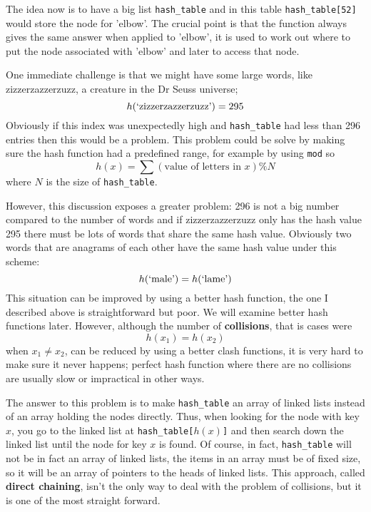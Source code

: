 \documentclass[11pt,a4paper]{scrartcl}
\begin{document}
The idea now is to have a big list \texttt{hash\_table} and in this
table \texttt{hash\_table[52]} would store the node for 'elbow'. The
crucial point is that the function always gives the same answer when
applied to 'elbow', it is used to work out where to put the node
associated with 'elbow' and later to access that node.

One immediate challenge is that we might have some large words, like
zizzerzazzerzuzz, a creature in the Dr Seuss universe;
\begin{equation}
h(\mbox{\lq{}zizzerzazzerzuzz\rq{}})=295
\end{equation}
Obviously if this index was unexpectedly high and \texttt{hash\_table}
had less than 296 entries then this would be a problem. This problem
could be solve by making sure the hash function had a predefined
range, for example by using \texttt{mod} so
\begin{equation}
h(x)=\sum{(\mbox{value of letters in }x)}\% N
\end{equation}
where $N$ is the size of \texttt{hash\_table}.

However, this discussion exposes a greater problem: 296 is not a big
number compared to the number of words and if zizzerzazzerzuzz only
has the hash value 295 there must be lots of words that share the same
hash value. Obviously two words that are anagrams of each other have
the same hash value under this scheme:
\begin{equation}
h(\mbox{\lq{}male\rq{}})=h(\mbox{\lq{}lame\rq{}})
\end{equation}
This situation can be improved by using a better hash function, the
one I described above is straightforward but poor. We will examine
better hash functions later. However, although the number of
\textbf{collisions}, that is cases were
\begin{equation}
h(x_1)=h(x_2)
\end{equation}
when $x_1\not=x_2$, can be reduced by using a better clash functions,
it is very hard to make sure it never happens; perfect hash function
where there are no collisions are usually slow or impractical in other
ways.

The answer to this problem is to make \texttt{hash\_table} an array of
linked lists instead of an array holding the nodes directly. Thus,
when looking for the node with key $x$, you go to the linked list at
\texttt{hash\_table[$h(x)$]} and then search down the linked list
until the node for key $x$ is found. Of course, in fact,
\texttt{hash\_table} will not be in fact an array of linked lists, the
items in an array must be of fixed size, so it will be an array of
pointers to the heads of linked lists. This approach, called
\textbf{direct chaining}, isn't the only way to deal with the problem
of collisions, but it is one of the most straight forward.
\end{document}
